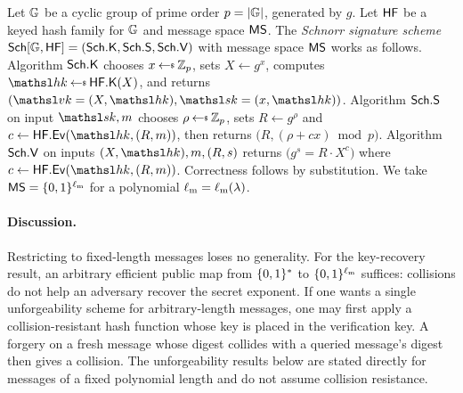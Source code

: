  Let $\mathbb{G}$ be a cyclic group of prime order $p = |\mathbb{G}|$, generated by $g$. Let $\mathsf{HF}$ be a keyed hash family for $\mathbb{G}$ and message space $\mathsf{MS}$. The \emph{Schnorr signature scheme}~\cite{C:FiaSha86,C:Schnorr89} $\mathsf{Sch}[\mathbb{G},\mathsf{HF}] = (\mathsf{Sch}.\mathsf{K},\mathsf{Sch}.\mathsf{S},\mathsf{Sch}.\mathsf{V})$ with message space $\mathsf{MS}$ works as follows. Algorithm $\mathsf{Sch}.\mathsf{K}$ chooses $x \getsr \Zp$, sets $X \gets g^x$, computes $\hk \getsr \HFKg(X)$, and returns $(\vkey=(X,\hk),\skey=(x,\hk))$. Algorithm $\mathsf{Sch}.\mathsf{S}$ on input $\skey,m$ chooses $\rho \getsr \Zp$, sets $R \gets g^{\rho}$ and $c \gets \HFEv(\hk, (R, m))$, then returns $\big(R,(\rho+ cx)\bmod p\big)$. Algorithm $\mathsf{Sch}.\mathsf{V}$ on inputs $(X,\hk),m,(R,s)$ returns $\big(g^s = R \cdot X^c\big)$ where $c \gets \HFEv(\hk, (R, m))$.
Correctness follows by substitution. We take $\mathsf{MS} = \{0,1\}^{\ell_{\mathrm{m}}}$ for a polynomial $\ell_{\mathrm{m}} = \ell_{\mathrm{m}}(\lambda)$.

\paragraph*{Discussion.} Restricting to fixed-length messages loses no generality. For the key-recovery result, an arbitrary efficient public map from $\{0,1\}^*$ to $\{0,1\}^{\ell_{\mathrm{m}}}$ suffices: collisions do not help an adversary recover the secret exponent. If one wants a single unforgeability scheme for arbitrary-length messages, one may first apply a collision-resistant hash function whose key is placed in the verification key. A forgery on a fresh message whose digest collides with a queried message's digest then gives a collision. The unforgeability results below are stated directly for messages of a fixed polynomial length and do not assume collision resistance.

